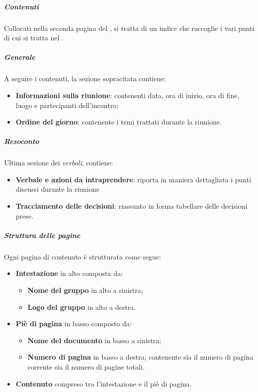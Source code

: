     \subparagraph{Contenuti}
    Collocati nella seconda pagina del \docNameVLow{}, si tratta di un indice che raccoglie i vari punti di cui si tratta nel \docNameVLow{}.
    
    \subparagraph{Generale} 
    A seguire i contenuti, la sezione sopracitata contiene:
    \begin {itemize}
        \item \textbf{Informazioni sulla riunione}: contenenti data, ora di inizio, ora di fine, luogo e partecipanti dell'incontro;
        \item \textbf{Ordine del giorno}: contenente i temi trattati durante la riunione.
    \end {itemize}
    
    \subparagraph{Resoconto}
    Ultima sezione dei \textit{verbali}, contiene:
    \begin{itemize}
        \item \textbf{Verbale e azioni da intraprendere}: riporta in maniera dettagliata i punti discussi durante la riunione
        \item \textbf{Tracciamento delle decisioni}: riassunto in forma tabellare delle decisioni prese.
    \end{itemize}

    \subparagraph{Struttura delle pagine}
    Ogni pagina di contenuto è strutturata come segue:
    \begin {itemize}
        \item \textbf{Intestazione} in alto composta da:
        \begin {itemize}
            \item \textbf{Nome del gruppo} in alto a sinistra;
            \item \textbf{Logo del gruppo} in alto a destra.
        \end{itemize}
        \item \textbf{Piè di pagina} in basso composto da:
        \begin{itemize}
            \item \textbf{Nome del documento} in basso a sinistra;
            \item \textbf{Numero di pagina} in basso a destra, contenente sia il numero di pagina corrente sia il numero di pagine totali.
        \end {itemize}
            \item \textbf{Contenuto} compreso tra l'intestazione e il piè di pagina.
    \end {itemize}




